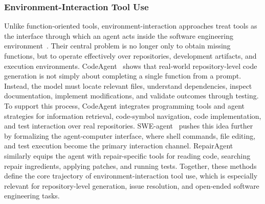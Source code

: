 \documentclass{llmxive}
\begin{document}
\subsubsection{Environment-Interaction Tool Use}
Unlike function-oriented tools, environment-interaction approaches treat tools as the interface through which an agent acts inside the software engineering environment~\cite{li2026environment,chen2026grounded,song2026envscaler,gao2026teaching}. Their central problem is no longer only to obtain missing functions, but to operate effectively over repositories, development artifacts, and execution environments. CodeAgent~\cite{zhang2024codeagent} shows that real-world repository-level code generation is not simply about completing a single function from a prompt. Instead, the model must locate relevant files, understand dependencies, inspect documentation, implement modifications, and validate outcomes through testing. To support this process, CodeAgent integrates programming tools and agent strategies for information retrieval, code-symbol navigation, code implementation, and test interaction over real repositories. SWE-agent~\cite{yang2024swe} pushes this idea further by formalizing the agent-computer interface, where shell commands, file editing, and test execution become the primary interaction channel. RepairAgent~\cite{bouzenia2025repairagent} similarly equips the agent with repair-specific tools for reading code, searching repair ingredients, applying patches, and running tests. Together, these methods define the core trajectory of environment-interaction tool use, which is especially relevant for repository-level generation, issue resolution, and open-ended software engineering tasks.
\end{document}
